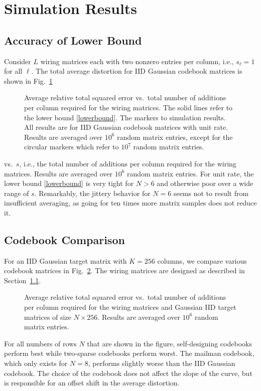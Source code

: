 \documentclass[twocolumn]{IEEEtran}
\begin{document}



\section{Simulation Results}
\label{simres}

\subsection{Accuracy of Lower Bound}
\label{acclowbou}

Consider $L$ wiring matrices each with two nonzero entries per column, i.e., $s_\ell=1$ for all $\ell$.
The total average distortion for IID Gaussian codebook matrices is shown in Fig.~\ref{testLB} 
\begin{figure}
\caption{Average relative total squared error vs.\ total number of additions per column required for the wiring matrices. The solid lines refer to the lower bound \eqref{lowerbound}. The markers to simulation results. All results are for IID Gaussian codebook matrices with unit rate. Results are averaged over $10^6$ random matrix entries, except for the circular markers which refer to $10^7$ random matrix entries.
\label{testLB}}
\end{figure}
vs.\ $s$, i.e., the total number of additions per column required for the wiring matrices.
Results are averaged over $10^6$ random matrix entries.
For unit rate, the lower bound \eqref{lowerbound} is very tight for $N>6$ and otherwise poor over a wide range of $s$.
Remarkably, the jittery behavior for $N=6$ seems not to result from insufficient averaging, as going for ten times more matrix samples does not reduce it. 

\subsection{Codebook Comparison}

For an IID Gaussian target matrix with $K=256$ columns, we compare various codebook matrices in Fig.~\ref{k256}. The wiring matrices are designed as described in Section~\ref{acclowbou}.
\begin{figure}
\caption{Average relative total squared error vs.\ total number of additions per column required for the wiring matrices and Gaussian IID target matrices of size $N\times 256$. Results are averaged over $10^6$ random matrix entries.
\label{k256}}
\end{figure}
For all numbers of rows $N$ that are shown in the figure, self-designing codebooks perform best while two-sparse codebooks perform worst. The mailman codebook, which only exists for $N=8$, performs slightly worse than the IID Gaussian codebook. The choice of the codebook does not affect the slope of the curve, but is responsible for an offset shift in the average distortion.
\end{document}
